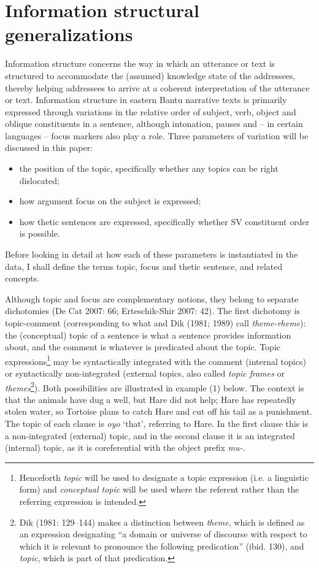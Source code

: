 \documentclass[output=paper]{langsci/langscibook}
\begin{document}
\section{Information structural generalizations}

Information structure concerns the way in which an utterance or text is structured to accommodate the (assumed) knowledge state of the addressees, thereby helping addressees to arrive at a coherent interpretation of the utterance or text. Information structure in eastern Bantu narrative texts is primarily expressed through variations in the relative order of subject, verb, object and oblique constituents in a sentence, although intonation, pauses and – in certain languages – focus markers also play a role. Three parameters of variation will be discussed in this paper:

\begin{itemize}
\item the position of the topic, specifically whether any topics can be right dislocated;
\item how argument focus on the subject is expressed;
\item how thetic sentences are expressed, specifically whether SV constituent order is possible.
\end{itemize}

Before looking in detail at how each of these parameters is instantiated in the data, I shall define the terms topic, focus and thetic sentence, and related concepts.

Although topic and focus are complementary notions, they belong to separate dichotomies (De Cat 2007: 66; Erteschik-Shir 2007: 42). The first dichotomy is topic-comment (corresponding to what \citet{Halliday1967} and Dik (1981; 1989) call \textit{theme-rheme}): the (conceptual) topic of a sentence is what a sentence provides information about, and the comment is whatever is predicated about the topic. Topic expressions\footnote{Henceforth \textit{topic} will be used to designate a topic expression (i.e. a linguistic form) and \textit{conceptual topic} will be used where the referent rather than the referring expression is intended.} may be syntactically integrated with the comment (internal topics) or syntactically non-integrated (external topics, also called \textit{topic frames} or \textit{themes}\footnote{Dik (1981: 129–144) makes a distinction between \textit{theme}, which is defined as an expression designating “a domain or universe of discourse with respect to which it is relevant to pronounce the following predication” (ibid. 130), and \textit{topic}, which is part of that predication.}). Both possibilities are illustrated in example (1) below. The context is that the animals have dug a well, but Hare did not help; Hare has repeatedly stolen water, so Tortoise plans to catch Hare and cut off his tail as a punishment. The topic of each clause is \emph{oyo} ‘that’, referring to Hare. In the first clause this is a non-integrated (external) topic, and in the second clause it is an integrated (internal) topic, as it is coreferential with the object prefix \emph{mu}\emph{\nobreakdash-}.
\end{document}
